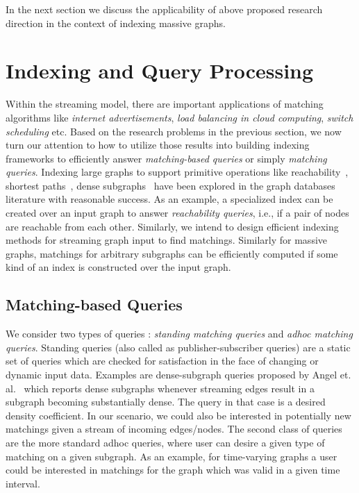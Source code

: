 \documentclass{scrartcl}
\begin{document}
In the next section we discuss the applicability of above proposed research direction in the context of indexing massive graphs.
\section{Indexing and Query Processing}

Within the streaming model, there are important applications of matching algorithms like \emph{internet advertisements}, \emph{load balancing in cloud computing}, \emph{switch scheduling} etc. Based on the research problems in the previous section, we now turn our attention to how to utilize those results into building indexing frameworks to efficiently answer \emph{matching-based queries} or simply \emph{matching queries}. Indexing large graphs to support primitive operations like reachability~\cite{seufert2013ferrari}, shortest paths~\cite{Gubichev:2010}, dense subgraphs~\cite{angel_dense_2013} have been explored in the graph databases literature with reasonable success.  As an example, a specialized index can be created over an input graph to answer \emph{reachability queries}, i.e., if a pair of nodes are reachable from each other. Similarly, we intend to design efficient indexing methods for streaming graph input to find matchings. Similarly for massive graphs, matchings for arbitrary subgraphs can be efficiently computed if some kind of an index is constructed over the input graph.

\subsection{Matching-based Queries} 
We consider two types of queries : \emph{standing matching queries} and \emph{adhoc matching queries}. Standing queries (also called as publisher-subscriber queries) are a static set of queries which are checked for satisfaction in the face of changing or dynamic input data. Examples are dense-subgraph queries proposed by Angel et. al.~\cite{angel_dense_2013} which reports dense subgraphs whenever streaming edges result in a subgraph becoming substantially dense. The query in that case is a desired density coefficient. In our scenario, we could also be interested in potentially new matchings given a stream of incoming edges/nodes. The second class of queries are the more standard adhoc queries, where user can desire a given type of matching on a given subgraph. As an example, for time-varying graphs a user could be interested in matchings for the graph which was valid in a given time interval.
\end{document}
